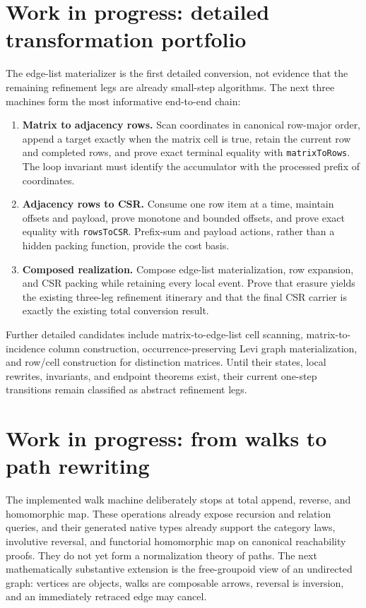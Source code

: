 \documentclass[11pt]{article}
\theoremstyle{remark}
\newcommand{\code}[1]{\texttt{#1}}
\begin{document}
\appendix

\section{Work in progress: detailed transformation portfolio}
\label{app:detailed-portfolio}

The edge-list materializer is the first detailed conversion, not evidence that
the remaining refinement legs are already small-step algorithms.  The next
three machines form the most informative end-to-end chain:
\begin{enumerate}[label=\arabic*.,leftmargin=2.2em]
  \item \textbf{Matrix to adjacency rows.}  Scan coordinates in canonical
        row-major order, append a target exactly when the matrix cell is true,
        retain the current row and completed rows, and prove exact terminal
        equality with \code{matrixToRows}.  The loop invariant must identify
        the accumulator with the processed prefix of coordinates.
  \item \textbf{Adjacency rows to CSR.}  Consume one row item at a time,
        maintain offsets and payload, prove monotone and bounded offsets, and
        prove exact equality with \code{rowsToCSR}.  Prefix-sum and payload
        actions, rather than a hidden packing function, provide the cost basis.
  \item \textbf{Composed realization.}  Compose edge-list materialization,
        row expansion, and CSR packing while retaining every local event.
        Prove that erasure yields the existing three-leg refinement itinerary
        and that the final CSR carrier is exactly the existing total
        conversion result.
\end{enumerate}

Further detailed candidates include matrix-to-edge-list cell scanning,
matrix-to-incidence column construction, occurrence-preserving Levi graph
materialization, and row/cell construction for distinction matrices.  Until
their states, local rewrites, invariants, and endpoint theorems exist, their
current one-step transitions remain classified as abstract refinement legs.

\section{Work in progress: from walks to path rewriting}
\label{app:walk-rewriting}

The implemented walk machine deliberately stops at total append, reverse, and
homomorphic map.  These operations already expose recursion and relation
queries, and their generated native types already support the category laws,
involutive reversal, and functorial homomorphic map on canonical reachability
proofs.  They do not yet form a normalization theory of paths.  The next
mathematically substantive extension is the free-groupoid view of an
undirected graph: vertices are objects, walks are composable arrows, reversal
is inversion, and an immediately retraced edge may cancel.
\end{document}
